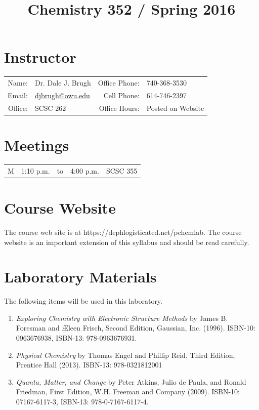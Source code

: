 \documentclass[letterpaper,oneside,onecolumn,11pt,article]{memoir}
\title{Chemistry 352 / Spring 2016}
\date{}
\author{}
\begin{document}
\maketitle
\thispagestyle{courseinformationtitle}
%
%
\section{Instructor}
\begin{tabular}{rl|rl}
Name: & Dr. Dale J. Brugh & Office Phone: & 740-368-3530 \\
Email: & \href{mailto:djbrugh@owu.edu}{djbrugh@owu.edu} & Cell Phone: & 614-746-2397 \\
Office: & SCSC 262 & Office Hours: & Posted on Website \\
\end{tabular}
%
%
\section{Meetings}
\begin{tabular}{crcrl}
M & 1:10 p.m. & to & 4:00 p.m. & SCSC 355 \\
\end{tabular}

\section{Course Website}
The course web site is at https://dephlogisticated.net/pchemlab. The course website is an important extension of this syllabus and should be read carefully. 

\section{Laboratory Materials}
The following items will be used in this laboratory. 
\begin{enumerate}[1.]
\item \textit{Exploring Chemistry with Electronic Structure Methods} by James B. Foresman and \AE leen Frisch, Second Edition, Gaussian, Inc. (1996). ISBN-10: 0963676938, ISBN-13: 978-0963676931.
\item \emph{Physical Chemistry} by Thomas Engel and Phillip Reid, Third Edition, Prentice Hall (2013).  ISBN-13: 978-0321812001
\item \emph{Quanta, Matter, and Change} by Peter Atkins, Julio de Paula, and Ronald Friedman, First Edition, W.H. Freeman and Company (2009). ISBN-10: 07167-6117-3, ISBN-13: 978-0-7167-6117-4.
\end{enumerate}
\end{document}
